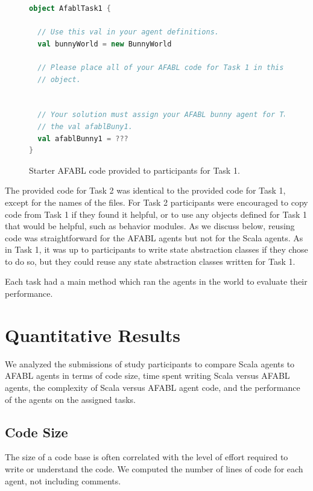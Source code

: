 \begin{figure}[!h]
\begin{center}

\begin{lstlisting}[language=Scala]
object AfablTask1 {

  // Use this val in your agent definitions.
  val bunnyWorld = new BunnyWorld

  // Please place all of your AFABL code for Task 1 in this singleton
  // object.


  // Your solution must assign your AFABL bunny agent for Task 1 to
  // the val afablBuny1.
  val afablBunny1 = ???
}
\end{lstlisting}

\caption{Starter AFABL code provided to participants for Task 1.}
\end{center}
\label{fig:afabl-task1-provided}
\end{figure}


The provided code for Task 2 was identical to the provided code for Task 1, except for the names of the files. For Task 2 participants were encouraged to copy code from Task 1 if they found it helpful, or to use any objects defined for Task 1 that would be helpful, such as behavior modules. As we discuss below, reusing code was straightforward for the AFABL agents but not for the Scala agents. As in Task 1, it was up to participants to write state abstraction classes if they chose to do so, but they could reuse any state abstraction classes written for Task 1.

Each task had a main method which ran the agents in the world to evaluate their performance.

\section{Quantitative Results}

We analyzed the submissions of study participants to compare Scala agents to AFABL agents in terms of code size, time spent writing Scala versus AFABL agents, the complexity of Scala versus AFABL agent code, and the performance of the agents on the assigned tasks.

\subsection{Code Size}

The size of a code base is often correlated with the level of effort required to write or understand the code. We computed the number of lines of code for each agent, not including comments.

